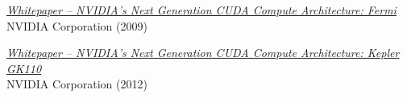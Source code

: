 \documentclass[paper=a4, fontsize=11pt]{scrartcl} %
\numberwithin{equation}{section} %
\numberwithin{figure}{section} %
\numberwithin{table}{section} %
\begin{document}
\begin{thebibliography}{100}
\href{http://www.nvidia.com/content/pdf/fermi_white_papers/nvidia_fermi_compute_architecture_whitepaper.pdf}{\textit{Whitepaper -- NVIDIA's Next Generation CUDA Compute Architecture: Fermi}} \\
NVIDIA Corporation (2009)

\href{http://www.nvidia.com/content/pdf/kepler/NVIDIA-kepler-GK110-Architecture-Whitepaper.pdf}{\textit{Whitepaper -- NVIDIA's Next Generation CUDA Compute Architecture: Kepler GK110}} \\
NVIDIA Corporation (2012)


\end{thebibliography}
\end{document}
